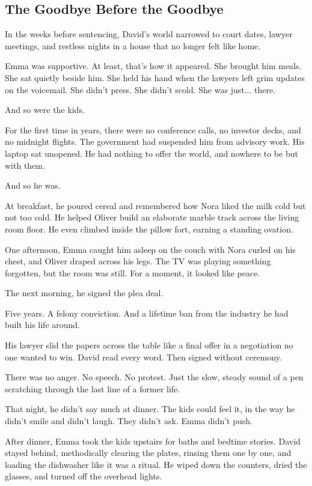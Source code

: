 
\subsection{The Goodbye Before the Goodbye}

In the weeks before sentencing, David’s world narrowed to court dates, lawyer meetings, and restless  
nights in a house that no longer felt like home.

Emma was supportive. At least, that’s how it appeared.  
She brought him meals. She sat quietly beside him. She held his hand when the lawyers left grim updates on 
the voicemail.  
She didn’t press. She didn’t scold. She was just... there.

And so were the kids.

For the first time in years, there were no conference calls, no investor decks, and no midnight flights.  
The government had suspended him from advisory work. His laptop sat unopened.  
He had nothing to offer the world, and nowhere to be but with them.

And so he was.

At breakfast, he poured cereal and remembered how Nora liked the milk cold but not too cold.  
He helped Oliver build an elaborate marble track across the living room floor. He even climbed inside 
the pillow fort, earning a standing ovation.

One afternoon, Emma caught him asleep on the couch with Nora curled on his chest, and Oliver draped  
across his legs.  
The TV was playing something forgotten, but the room was still.  
For a moment, it looked like peace.

The next morning, he signed the plea deal.

Five years.  
A felony conviction.  
And a lifetime ban from the industry he had built his life around.

His lawyer slid the papers across the table like a final offer in a negotiation no one wanted to win.  
David read every word. Then signed without ceremony.

There was no anger. No speech. No protest.  
Just the slow, steady sound of a pen scratching through the last line of a former life.

That night, he didn’t say much at dinner.  
The kids could feel it, in the way he didn't smile and didn't laugh.  
They didn’t ask.  
Emma didn’t push.

After dinner, Emma took the kids upstairs for baths and bedtime stories.
David stayed behind, methodically clearing the plates, rinsing them one by one, and loading the 
dishwasher like it was a ritual.
He wiped down the counters, dried the glasses, and turned off the overhead lights.

